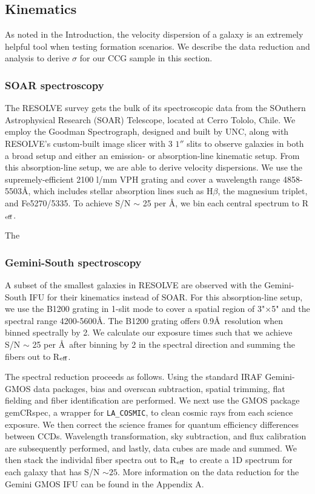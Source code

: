 \documentclass[iop,apj,twocolappendix]{emulateapj}
\newcommand{\Reff}{R$_{\rm eff}$}
\begin{document}
\subsection{Kinematics}
\label{kin}

\noindent As noted in the Introduction, the velocity dispersion of a galaxy is an extremely helpful tool when testing formation scenarios. We describe the data reduction and analysis to derive $\sigma$ for our CCG sample in this section. 

\subsubsection{SOAR spectroscopy}
\noindent The RESOLVE survey gets the bulk of its spectroscopic data from the SOuthern Astrophysical Research (SOAR) Telescope, located at Cerro Tololo, Chile. We employ the Goodman Spectrograph, designed and built by UNC, along with RESOLVE's custom-built image slicer with 3 $1''$ slits to observe galaxies in both a broad setup and either an emission- or absorption-line kinematic setup. From this absorption-line setup, we are able to derive velocity dispersions. We use the supremely-efficient 2100 l/mm VPH grating and cover a wavelength range 4858-5503\AA, which includes stellar absorption lines such as H$\beta$, the magnesium triplet, and Fe5270/5335. To achieve S/N $\sim$ 25 per \AA, we bin each central spectrum to \Reff.

The 

\subsubsection{Gemini-South spectroscopy}

\noindent A subset of the smallest galaxies in RESOLVE are observed with the Gemini-South IFU for their kinematics instead of SOAR. For this absorption-line setup, we use the B1200 grating in 1-slit mode to cover a spatial region of 3"$\times$5" and the spectral range 4200-5600\AA. The B1200 grating offers 0.9\AA\ resolution when binned spectrally by 2. We calculate our exposure times such that we achieve S/N $\sim$ 25 per \AA\,  after binning by 2 in the spectral direction and summing the fibers out to \Reff.

The spectral reduction proceeds as follows. Using the standard IRAF Gemini-GMOS data packages, bias and overscan subtraction, spatial trimming, flat fielding and fiber identification are performed. We next use the GMOS package gemCRspec, a wrapper for \texttt{LA\_COSMIC}, to clean cosmic rays from each science exposure. We then correct the science frames for quantum efficiency differences between CCDs. Wavelength transformation, sky subtraction, and flux calibration are subsequently performed, and lastly, data cubes are made and summed. We then stack the individal fiber spectra out to \Reff\ to create a 1D spectrum for each galaxy that has S/N $\sim25$. More information on the data reduction for the Gemini GMOS IFU can be found in the Appendix A.
\end{document}

